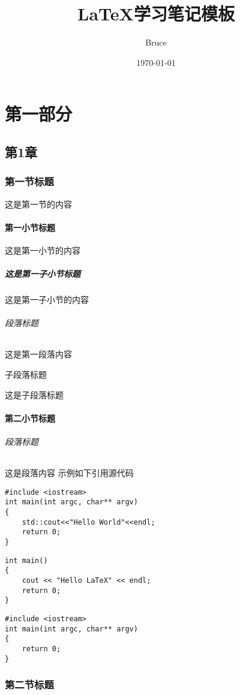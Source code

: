 \documentclass{article}
\title{\LaTeX{}学习笔记模板}
\author{Bruce}
\date{\today}
\begin{document}
\maketitle
\tableofcontents

\newpage

\part{第一部分}

{\huge \chapter{第1章}}

\section{第一节标题}
这是第一节的内容
\subsection{第一小节标题}
这是第一小节的内容
\subsubsection{这是第一子小节标题}
这是第一子小节的内容
\paragraph{段落标题}
  这是第一段落内容
\subparagraph{子段落标题}
   这是子段落标题
   
\subsection{第二小节标题}
\paragraph{段落标题} 
这是段落内容
示例如下引用源代码
\begin{verbatim}
#include <iostream>
int main(int argc, char** argv)
{
    std::cout<<"Hello World"<<endl;
    return 0;    
}
\end{verbatim}

\begin{verbatim}
int main()
{
    cout << "Hello LaTeX" << endl;
    return 0;
}
\end{verbatim}

\begin{lstlisting}[caption= hello world]
#include <iostream>
int main(int argc, char** argv)
{
    return 0;
}
\end{lstlisting}

\section{第二节标题}
\end{document}
